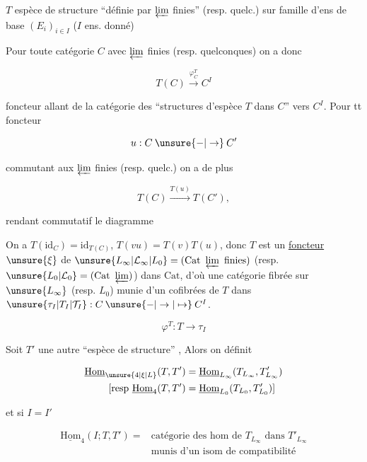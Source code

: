 $T$ espèce de structure ``définie par $\varprojlim$ finies'' (resp. quelc.)
sur famille d'ens de base $(E_i)_{i\in I}$ ($I$ ens. donné)

Pour toute catégorie $C$ avec $\varprojlim$ finies (resp. quelconques)
on a donc

\[
T(C)\xrightarrow{\varphi_C^T}C^I
\]

foncteur  allant de la catégorie des ``structures d'espèce
$T$ dans $C$'' vers $C^I$. Pour tt foncteur

\[
u:C\mathbin{\unsure{-|\to}}C'
\]

commutant aux $\varprojlim$ finies (resp. quelc.) on a de plus

\[
T(C)\xrightarrow{T(u)}T(C'),
\]

rendant commutatif le diagramme


On a $T(\mathrm{id}_C)=\mathrm{id}_{T(C)}$, $T(vu)=T(v)T(u)$, donc $T$ est un
\uline{foncteur} $\unsure{\xi}$ de $\unsure{L_\infty|\mathcal L_\infty|L_0}=(\mathrm{Cat}\ \varprojlim\ \mathrm{finies})$ (resp. $\unsure{L_0|\mathcal L_0}=(\mathrm{Cat}\ \varprojlim)$) dans
$\mathrm{Cat}$, d'où  une catégorie fibrée  sur $\unsure{L_\infty}$ (resp. $L_0$)
munie d'un  cofibrées de $T$ dans  $\unsure{\tau_I|T_I|\mathcal T_I}:C\mathbin{\unsure{-|\to|\mapsto}}C^I$.

\[
\varphi^T:T\longrightarrow \tau_I
\]

 Soit $T'$ une autre ``espèce de structure'' , Alors on définit

\[
\begin{aligned}
\underline{\mathrm{Hom}}_{\unsure{4|\xi|L}}(T,T')&=\underline{\mathrm{Hom}}_{L_\infty}(T_{L_\infty},T'_{L_\infty})\\
{}[\text{resp }\underline{\mathrm{Hom}}_{4}(T,T')&=\underline{\mathrm{Hom}}_{L_0}(T_{L_0},T'_{L_0})]
\end{aligned}
\]

et si $I=I'$

\[
\begin{aligned}
\underline{\mathrm{Hom}}_{4}(I;T,T')={}&\text{catégorie des hom de }T_{L_\infty}\text{ dans }T'_{L_\infty}\\
&\text{munis d'un isom de compatibilité}
\end{aligned}
\]

